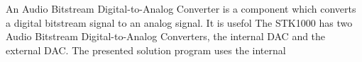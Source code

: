 An Audio Bitstream Digital-to-Analog Converter is a component which converts a digital bitstream signal to an analog signal.
It is usefol
The STK1000 has two Audio Bitstream Digital-to-Analog Converters, the internal DAC and the external DAC.
The presented solution program uses the internal

